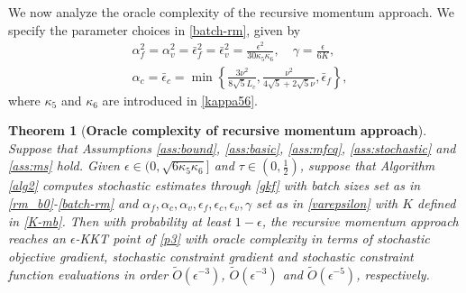 \documentclass[11pt]{article}
\newtheorem{theorem}{Theorem}
\newcommand{\be}{\begin{equation}}
\newcommand{\ee}{\end{equation}}
\begin{document}
We now analyze the oracle complexity of  the recursive momentum approach. We specify the parameter choices in \eqref{batch-rm}, given by
\be\label{varepsilon-rm} \begin{aligned}
    &\alpha_f^2 = \alpha_v^2 = \bar \epsilon_f^2 = \bar \epsilon_v^2 = \frac{\epsilon^2}{30\kappa_5\kappa_6},\quad {\gamma = \frac{\epsilon}{6K}},\\
    &\alpha_c=\bar \epsilon_c = \min \left\{\frac{3\nu^2}{8\sqrt{5}L_c},\frac{\nu^2}{4\sqrt{5}+2\sqrt{5}\nu},\bar\epsilon_f\right\},\end{aligned}\ee
    where \(\kappa_5\) and \(\kappa_6\) are introduced in \eqref{kappa56}.
\begin{theorem}[{\bf Oracle complexity of recursive momentum approach}]\label{thm:complexity-rm}
   {Suppose that Assumptions \ref{ass:bound}, \ref{ass:basic}, \ref{ass:mfcq}, \ref{ass:stochastic} and \ref{ass:ms} hold.} Given \(\epsilon \in (0, \sqrt{6 \kappa_5 \kappa_6}]\) and \(\tau \in (0,\frac{1}{2})\), suppose that Algorithm \ref{alg2} computes stochastic estimates through \eqref{gkf}  with 
    batch sizes  set as in \eqref{rm_b0}-\eqref{batch-rm} and \(\alpha_f,\alpha_c,\alpha_v,\epsilon_f, \epsilon_c, \epsilon_v, \gamma\)   set as in \eqref{varepsilon} with \(K\) defined in \eqref{K-mb}. Then with probability at least \(1-\epsilon\), the recursive momentum approach reaches an $\epsilon$-KKT point of \eqref{p3} with 
    oracle complexity in terms of stochastic objective gradient, stochastic constraint gradient and stochastic constraint function evaluations in order \( \tilde O(\epsilon^{-3}) \), \( \tilde O(\epsilon^{-3}) \) and \( \tilde O(\epsilon^{-5}) \), respectively.
\end{theorem}
\end{document}

